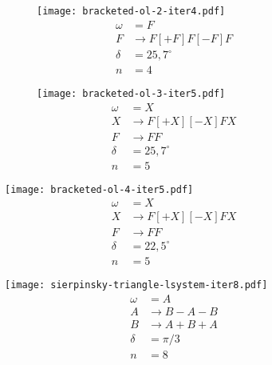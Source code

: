 \begin{figure}[H]
    \centering
    \begin{subfigure}{0.45\textwidth}
        \centering
        \texttt{[image: bracketed-ol-2-iter4.pdf]}
        \begin{align*}
            \omega&=F\\
            F&\to F[+F]F[-F]F\\
            \delta&=25{,}7^\circ\\
            n&=4
        \end{align*}
    \end{subfigure}
    \qquad
    \begin{subfigure}{0.45\textwidth}
        \centering
        \texttt{[image: bracketed-ol-3-iter5.pdf]}
        \begin{align*}
            \omega&=X\\
            X&\to F[+X][-X]FX\\
            F&\to FF\\
            \delta&=25{,}7^\circ\\
            n&=5
        \end{align*}
    \end{subfigure}
\end{figure}
\begin{figure}[H]
    \centering
    \texttt{[image: bracketed-ol-4-iter5.pdf]}
    \begin{align*}
        \omega&=X\\
        X&\to F[+X][-X]FX\\
        F&\to FF\\
        \delta&=22{,}5^\circ\\
        n&=5
    \end{align*}
\end{figure}
\begin{figure}[H]
    \centering
    \texttt{[image: sierpinsky-triangle-lsystem-iter8.pdf]}
    \begin{align*}
        \omega&=A\\
        A&\to B-A-B\\
        B&\to A+B+A\\
        \delta&=\pi/3\\
        n&=8
    \end{align*}
\end{figure}